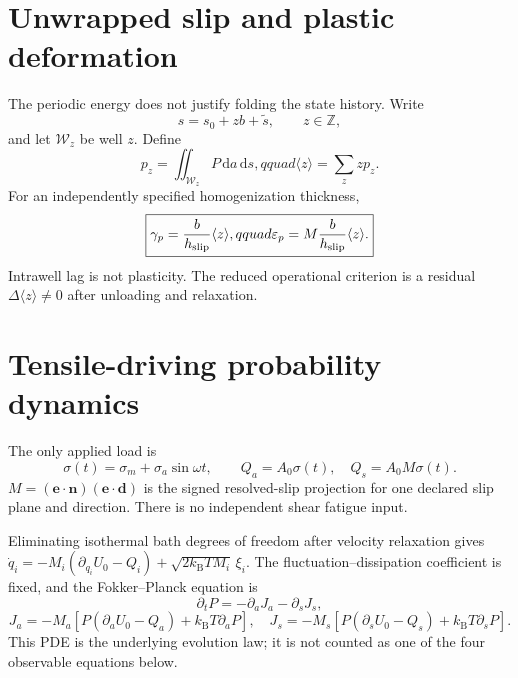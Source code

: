 \documentclass[11pt,letterpaper]{article}
\newcommand{\kB}{k_{\mathrm B}}
\newcommand{\dd}{\,\mathrm d}
\begin{document}
\section{Unwrapped slip and plastic deformation}
\label{sec:plastic}

The periodic energy does not justify folding the state history.  Write
\begin{equation}\boxed{s=s_0+zb+\widetilde s,\qquad z\in\mathbb Z,}
\label{eq:unwrapped}\end{equation}
and let $\mathcal W_z$ be well $z$.  Define
\begin{equation}
 p_z=\iint_{\mathcal W_z}P\dd a\dd s,qquad
 \langle z\rangle=\sum_z zp_z.
\end{equation}
For an independently specified homogenization thickness,
\begin{equation}
 \boxed{\gamma_p={b\over h_{\rm slip}}\langle z\rangle,qquad
 \varepsilon_p=M{b\over h_{\rm slip}}\langle z\rangle.}
 \label{eq:plastic-strain}
\end{equation}
Intrawell lag is not plasticity.  The reduced operational criterion is a
residual $\Delta\langle z\rangle\ne0$ after unloading and relaxation.

\section{Tensile-driving probability dynamics}
\label{sec:dynamics}

The only applied load is
\begin{equation}
 \boxed{\sigma(t)=\sigma_m+\sigma_a\sin\omega t,\qquad
 Q_a=A_0\sigma(t),\quad Q_s=A_0M\sigma(t).}
 \label{eq:driving}
\end{equation}
$M=(\bm e\cdot\bm n)(\bm e\cdot\bm d)$ is the signed resolved-slip
projection for one declared slip plane and direction.  There is no independent
shear fatigue input.

Eliminating isothermal bath degrees of freedom after velocity relaxation gives
$\dot q_i=-M_i(\partial_{q_i}U_0-Q_i)+\sqrt{2\kB TM_i}\,\xi_i$.
The fluctuation--dissipation coefficient is fixed, and the Fokker--Planck
equation is~\cite{Risken,Gardiner}
\begin{equation}
 \boxed{\partial_tP=-\partial_aJ_a-\partial_sJ_s,}
 \label{eq:smol}
\end{equation}
\begin{equation}
 \boxed{J_a=-M_a[P(\partial_aU_0-Q_a)+\kB T\partial_aP],\quad
 J_s=-M_s[P(\partial_sU_0-Q_s)+\kB T\partial_sP].}
 \label{eq:currents}
\end{equation}
This PDE is the underlying evolution law; it is not counted as one of the
four observable equations below.
\end{document}
